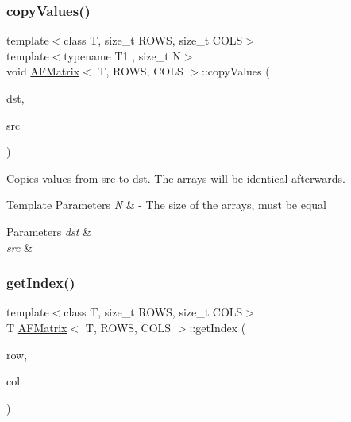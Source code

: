 \subsubsection{\texorpdfstring{copy\+Values()}{copyValues()}\hspace{0.1cm}{\footnotesize\ttfamily [3/3]}}
{\footnotesize\ttfamily template$<$class T, size\+\_\+t R\+O\+WS, size\+\_\+t C\+O\+LS$>$ \\
template$<$typename T1 , size\+\_\+t N$>$ \\
void \hyperlink{class_a_f_matrix}{A\+F\+Matrix}$<$ T, R\+O\+WS, C\+O\+LS $>$\+::copy\+Values (\begin{DoxyParamCaption}\item[{array$<$ T1, N $>$ $\ast$}]{dst,  }\item[{array$<$ T1, N $>$ $\ast$}]{src }\end{DoxyParamCaption})\hspace{0.3cm}{\ttfamily [inline]}}

Copies values from {\ttfamily src} to {\ttfamily dst}. The arrays will be identical afterwards. 
\begin{DoxyTemplParams}{Template Parameters}
{\em N} & -\/ The size of the arrays, must be equal \\
\hline
\end{DoxyTemplParams}

\begin{DoxyParams}{Parameters}
{\em dst} & \\
\hline
{\em src} & \\
\hline
\end{DoxyParams}
\mbox{\label{class_a_f_matrix_a1363727b7a4b97bad5e7c9d9552d9cf5}} 
\subsubsection{\texorpdfstring{get\+Index()}{getIndex()}}
{\footnotesize\ttfamily template$<$class T, size\+\_\+t R\+O\+WS, size\+\_\+t C\+O\+LS$>$ \\
T \hyperlink{class_a_f_matrix}{A\+F\+Matrix}$<$ T, R\+O\+WS, C\+O\+LS $>$\+::get\+Index (\begin{DoxyParamCaption}\item[{int}]{row,  }\item[{int}]{col }\end{DoxyParamCaption})\hspace{0.3cm}{\ttfamily [inline]}}


